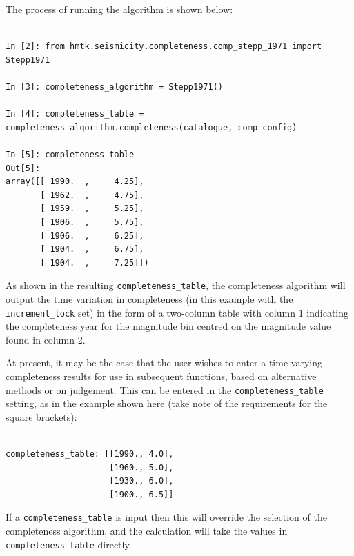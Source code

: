 The process of running the algorithm is shown below:

\begin{Verbatim}[frame=single, commandchars=\\\{\}, fontsize=\scriptsize, samepage=true]

In [2]: from hmtk.seismicity.completeness.comp_stepp_1971 import Stepp1971

In [3]: completeness_algorithm = Stepp1971()

In [4]: completeness_table = completeness_algorithm.completeness(catalogue, comp_config)

In [5]: completeness_table
Out[5]: 
array([[ 1990.  ,     4.25],
       [ 1962.  ,     4.75],
       [ 1959.  ,     5.25],
       [ 1906.  ,     5.75],
       [ 1906.  ,     6.25],
       [ 1904.  ,     6.75],
       [ 1904.  ,     7.25]])

\end{Verbatim}

As shown in the resulting \verb=completeness_table=, the completeness algorithm will output the time variation in completeness (in this example with the \verb=increment_lock= set) in the form of a two-column table with column 1 indicating the completeness year for the magnitude bin centred on the magnitude value found in column 2.


At present, it may be the case that the user wishes to enter a time-varying completeness results for use in subsequent functions, based on alternative methods or on judgement. This can be entered in the \verb=completeness_table= setting, as in the example shown here (take note of the requirements for the square brackets):

\begin{Verbatim}[frame=single, commandchars=\\\{\}, fontsize=\scriptsize]

completeness_table: [[1990., 4.0],
                     [1960., 5.0],
                     [1930., 6.0],
                     [1900., 6.5]]

\end{Verbatim}

If a \verb=completeness_table= is input then this will override the selection of the completeness algorithm, and the calculation will take the values in \verb=completeness_table= directly. 


